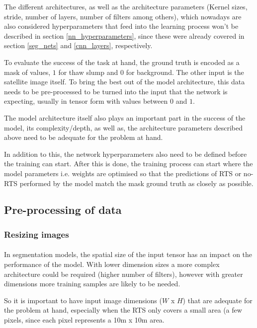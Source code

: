 The different architectures, as well as the architecture parameters (Kernel sizes, stride, number of layers, number of filters among others), which nowadays are also considered hyperparameters that feed into the learning process won't be described in section \ref{nn_hyperparameters}, since these were already covered in section \ref{seg_nets} and \ref{cnn_layers}, respectively.

To evaluate the success of the task at hand, the ground truth is encoded as a mask of values, $1$ for thaw slump and $0$ for background. The other input is the satellite image itself. To bring the best out of the model architecture, this data needs to be pre-processed to be turned into the input that the network is expecting, usually in tensor form with values between $0$ and $1$.

The model architecture itself also plays an important part in the success of the model, its complexity/depth, as well as, the architecture parameters described above need to be adequate for the problem at hand.

In addition to this, the network hyperparameters also need to be defined before the training can start. After this is done, the training process can start where the model parameters \gls{i.e.} weights are optimised so that the predictions of \gls{RTS} or no-\gls{RTS} performed by the model match the mask ground truth as closely as possible.

\subsection{Pre-processing of data} \label{data_preproc}
\subsubsection{Resizing images} \label{img_resize}
\paragraph{}
In segmentation models, the spatial size of the input tensor has an impact on the performance of the model. With lower dimension sizes a more complex architecture could be required (higher number of filters), however with  greater dimensions more training samples are likely to be needed.

So it is important to have input image dimensions ($W$ x $H$) that are adequate for the problem at hand, especially when the \gls{RTS} only covers a small area (a few pixels, since each pixel represents a 10m x 10m area.

